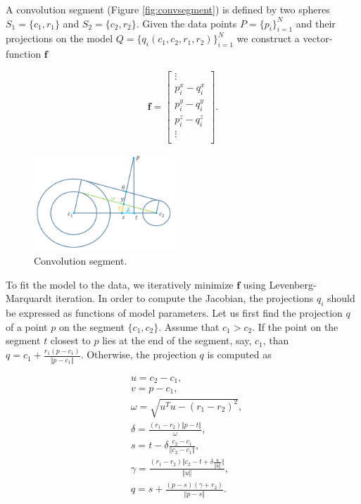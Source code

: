 \documentclass[10pt,journal,a4paper]{IEEEtran}
\begin{document}
A convolution segment (Figure \ref{fig:convsegment}) is defined by two spheres $S_1 = \{c_1, r_1\}$ and $S_2 = \{c_2, r_2\}$.
Given the data points $P = \{p_i\}_{i = 1}^N$ and their projections on the model  $Q = \{q_i(c_1, c_2, r_1, r_2)\}_{i = 1}^N$  we construct a vector-function $\textbf{f}$ 

 \begin{equation}
 	\textbf{f} = \left[
 		\begin{array}{c}
 			\vdots \\
			p_i^x - q_i^x\\
			p_i^y - q_i^y\\
			p_i^z - q_i^z\\
			\vdots \\
	\end{array}
 	\right].
 \end{equation} 

\begin{figure}[h!] 
	\centering
	\hspace{-2em}
	\includegraphics[width=0.47\textwidth]{figures/projection_convsegment.png}
	\caption{Convolution segment.}
	\label{fig:projection_convsegment}
\end{figure}

To fit the model to the data, we iteratively minimize $\textbf{f}$ using Levenberg-Marquardt iteration. In order to compute the Jacobian, the projections $q_i$ should be expressed as functions of model parameters. Let us first find the projection $q$ of a point $p$ on the segment $\{c_1, c_2\}$. Assume that $c_1 > c_2$. If the point on the segment $t$ closest to $p$ lies at the end of the segment, say, $c_1$, than $q = c_1 + \frac{r_1  (p - c_1)}{\Vert p - c_1 \Vert}$. 
Otherwise, the projection $q$ is computed as 

\begin{align*}
& u = c_2 - c_1, \\
& v = p - c_1, \\
& \omega = \sqrt{u^T u - (r_1 - r_2)^2}, \\
&  \delta =  \frac{(r_1 - r_2) \Vert p - t \Vert}{\omega}, \\
&   s = t - \delta  \frac{c_2 - c_1} {\Vert c_2 - c_1 \Vert}, \\
&  \gamma = \frac{(r_1 - r_2)   {\Vert c_2 - t + \delta  \frac{u} {\Vert u \Vert}} \Vert} {\Vert u \Vert}, \\
&   q = s +\frac{ (p - s) (\gamma + r_2) }{ \Vert p - s \Vert } .
\end{align*}
\end{document}
